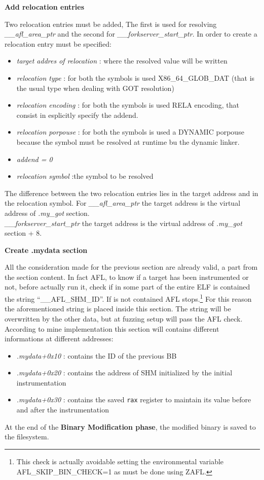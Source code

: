 \begin{center}
\textbf{Add relocation entries}    
\end{center}
Two relocation entries must be added, The first is used for resolving \textit{\_\_afl\_area\_ptr} and the second for 
\textit{\_\_forkserver\_start\_ptr}.
In order to create a relocation entry must be specified:
\begin{itemize}
    \item \textit{target addres of relocation} : where the resolved value will be written
    \item \textit{relocation type} : for both the symbols is used X86\_64\_GLOB\_DAT (that is the usual type when dealing with \gls{GOT} resolution)
    \item \textit{relocation encoding} : for both the symbols is used RELA encoding, that consist in esplicitly specify the addend.
    \item \textit{relocation porpouse} : for both the symbols is used a DYNAMIC porpouse because the symbol must be resolved at runtime bu the dynamic linker.
    \item \textit{addend = 0}
    \item \textit{relocation symbol} :the symbol to be resolved
\end{itemize}
The difference between the two relocation entries lies in the target address and in the relocation symbol.
For \textit{\_\_afl\_area\_ptr} the target address is the virtual address of \textit{.my\_got} section.\\
\textit{\_\_forkserver\_start\_ptr} the target address is the virtual address of \textit{.my\_got} section + 8.

\begin{center}
\textbf{Create .mydata section}    
\end{center}
All the consideration made for the previous section are already valid, a part from the section content.
In fact AFL, to know if a target has been instrumented or not, before actually run it, check if in some part of the entire 
\gls{ELF} is contained the string ``\_\_AFL\_SHM\_ID''. If is not contained AFL stops.\footnote{
    This check is actually avoidable setting the environmental variable AFL\_SKIP\_BIN\_CHECK=1 as must be done using ZAFL.
}
For this reason the aforementioned string is placed inside this section.
The string will be overwritten by the other data, but at fuzzing setup will pass the AFL check.
According to mine implementation this section will contains different informations at different addresses:
\begin{itemize}
    \item \textit{.mydata+0x10} : contains the ID of the previous \gls{BB}
    \item \textit{.mydata+0x20} : contains the address of \gls{SHM} initialized by the initial instrumentation
    \item \textit{.mydata+0x30} : contains the saved \texttt{rax} register to maintain its value before and after the instrumentation
\end{itemize}
At the end of the \textbf{Binary Modification phase}, the modified binary is saved to the filesystem.
